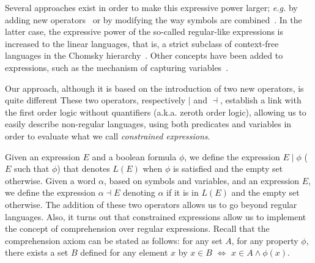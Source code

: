 \documentclass[a4paper]{llncs}
\begin{document}
  Several approaches exist in order to make this expressive power larger; \emph{e.g.} by adding new operators~\cite{CDJM13} or by modifying the way symbols are combined~\cite{Brz68,Semp00}. In the latter case, the expressive power of the so-called regular-like expressions is increased to the linear languages, that is, a strict subclass of context-free languages in the Chomsky hierarchy~\cite{Cho56}.
  Other concepts have been added to expressions, such as the mechanism of capturing variables~\cite{CSY03,SL12}.
  
Our approach, although it is based on the introduction of two new operators, is quite different
These two operators, respectively $\mid$ and $\dashv$, establish a link with the first order logic without quantifiers (a.k.a. zeroth order logic), allowing us to easily describe non-regular languages, using both predicates and variables in order to evaluate  what we call \emph{constrained expressions}.

Given an expression $E$ and a boolean formula $\phi$, we define the expression $E\mid \phi$ ($E$ such that $\phi$) that denotes $L(E)$ when $\phi$ is satisfied and the empty set otherwise. Given a word $\alpha$, based on symbols and variables, and an expression $E$, we define the expression $\alpha \dashv E$ denoting $\alpha$ if it is in $L(E)$ and the empty set otherwise. The addition of these two operators allows us to go beyond regular languages.
Also, it turns out that constrained expressions allow us to implement  the concept of comprehension over regular expressions. Recall that the comprehension axiom can be stated as follows: for any set $A$, for any property $\phi$, there exists a set $B$ defined for any element $x$ by $x\in B$ $\Leftrightarrow$ $x\in A \wedge \phi(x)$.  
\end{document}
